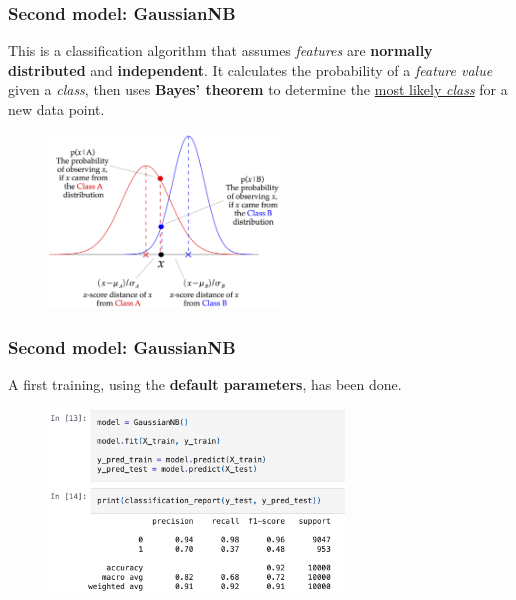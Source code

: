 \documentclass{beamer}
\begin{document}
\begin{frame}
\frametitle{Second model: \textbf{GaussianNB}}
This is a classification algorithm that assumes \textit{features} are \textbf{normally distributed} and \textbf{independent}. It calculates the probability of a \textit{feature value} given a \textit{class}, then uses \textbf{Bayes' theorem} to determine the \underline{most likely \textit{class}} for a new data point. 
\begin{figure}
\centering
    \includegraphics[width=0.55\textwidth]{imgs/gnb.png}
    \label{fig:gnb}
\end{figure}
\end{frame}

\begin{frame}
\frametitle{Second model: \textbf{GaussianNB}}
A first training, using the \textbf{default parameters}, has been done.
\begin{figure}
\centering
    \includegraphics[width=0.7\textwidth]{imgs/gnb_code.png}
    \label{fig:gnb_code}
\end{figure}
\end{frame}
\end{document}
